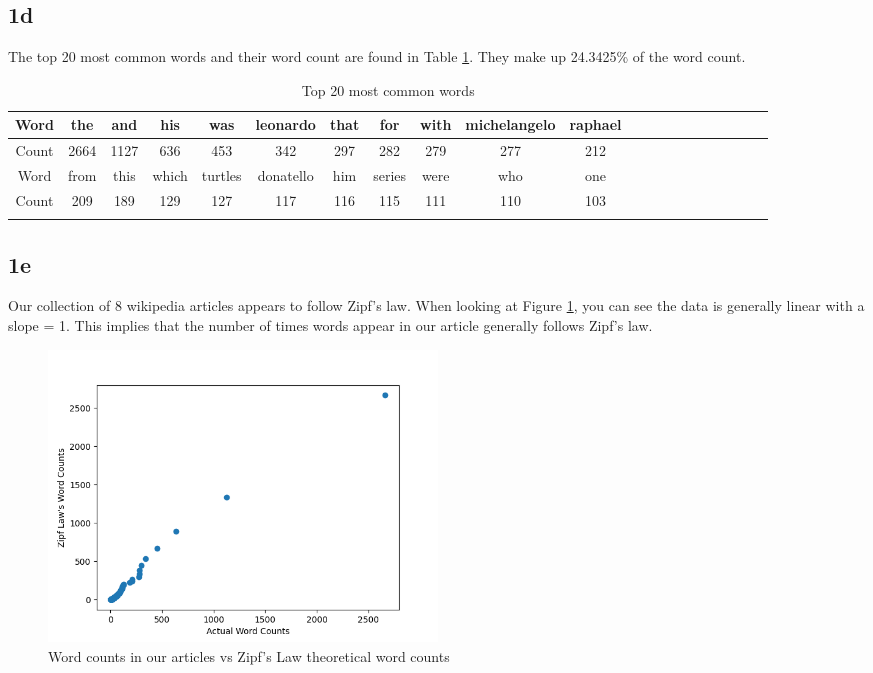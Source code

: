\documentclass[12pt]{article}
\begin{document}
\subsection*{1d}

The top 20 most common words and their word count are found in Table \ref{word_count}. They make up 24.3425\% of the word count.

\begin{table}[h!]
    \centering
    \caption{Top 20 most common words}
    \vspace*{4mm}
    \label{word_count}
    \begin{tabular}{c|cccccccccccccccccccc}
        \Xhline{3\arrayrulewidth}
        Word & the & and & his & was & leonardo & that & for & with & michelangelo & raphael\\\hline
        Count & 2664 & 1127 & 636 & 453 & 342 & 297 & 282 & 279 & 277 & 212 \\
        \Xhline{3\arrayrulewidth}
        Word &  from & this & which & turtles & donatello & him & series & were & who & one \\\hline
        Count & 209 & 189 & 129 & 127 & 117 & 116 & 115 & 111 & 110 & 103 \\
        \Xhline{3\arrayrulewidth}
    \end{tabular}
\end{table}

\subsection*{1e}

Our collection of 8 wikipedia articles appears to follow Zipf's law. When looking at Figure \ref{fig:zipf}, you can see the data is generally linear with a slope = 1. This implies that the number of times words appear in our article generally follows Zipf's law.

\begin{figure}
    \centering
    \includegraphics[width=0.5\textwidth]{../plots/zipf_law.png}
    \caption{Word counts in our articles vs Zipf's Law theoretical word counts}
    \label{fig:zipf}
\end{figure}
\end{document}
